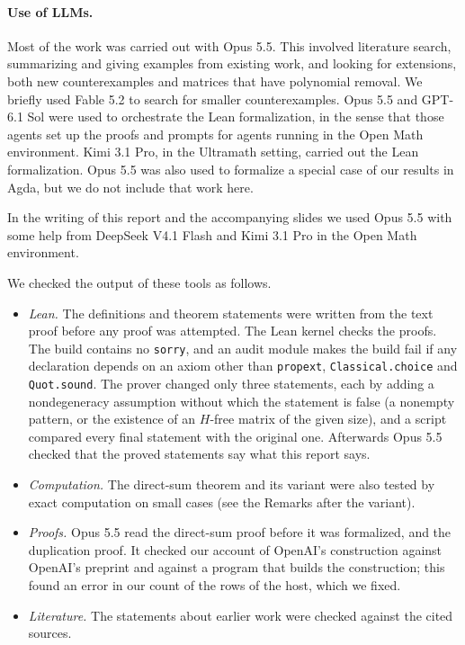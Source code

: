 \documentclass{article}
\theoremstyle{plain}
\theoremstyle{definition}
\begin{document}
\paragraph{Use of LLMs.} Most of the work was carried out with Opus 5.5.
This involved literature search, summarizing and giving examples from existing work, and looking for extensions, both new counterexamples and
matrices that have polynomial removal. We briefly used Fable 5.2 to search for smaller counterexamples. Opus 5.5 and GPT-6.1 Sol were used to orchestrate the Lean formalization, in the sense that those agents set up the proofs and prompts for agents running in the Open Math environment. Kimi 3.1 Pro, in the Ultramath setting, carried out the Lean formalization. Opus 5.5 was also used to formalize a special case of our results in Agda, but we do not include that work here.

In the writing of this report and the accompanying slides we used Opus 5.5 with some help from DeepSeek V4.1 Flash and Kimi 3.1 Pro in the Open Math environment.

We checked the output of these tools as follows.
\begin{itemize}
\item \emph{Lean.} The definitions and theorem statements were written from the text proof before
any proof was attempted. The Lean kernel checks the proofs. The build contains no \texttt{sorry},
and an audit module makes the build fail if any declaration depends on an axiom other than
\texttt{propext}, \texttt{Classical.choice} and \texttt{Quot.sound}. The prover changed only three
statements, each by adding a nondegeneracy assumption without which the statement is false (a
nonempty pattern, or the existence of an $H$-free matrix of the given size), and a script compared
every final statement with the original one. Afterwards Opus 5.5 checked that the proved
statements say what this report says.
\item \emph{Computation.} The direct-sum theorem and its variant were also tested by exact
computation on small cases (see the Remarks after the variant).
\item \emph{Proofs.} Opus 5.5 read the direct-sum proof before it was formalized, and the
duplication proof. It checked our account of OpenAI's construction against OpenAI's preprint and
against a program that builds the construction; this found an error in our count of the rows of
the host, which we fixed.
\item \emph{Literature.} The statements about earlier work were checked against the cited
sources.
\end{itemize}
\end{document}
